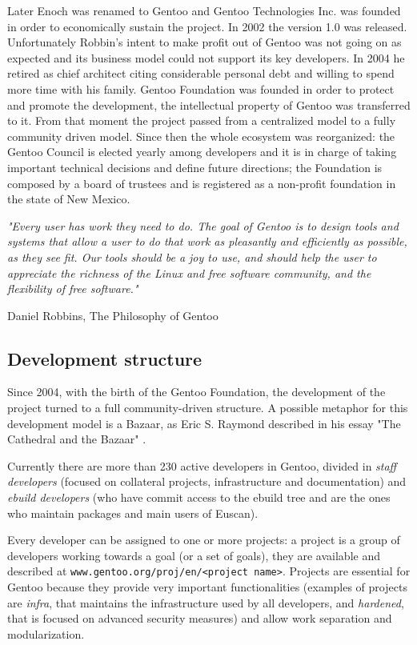 Later Enoch was renamed to Gentoo and Gentoo Technologies Inc. was founded in order to economically sustain the project. In 2002 the version 1.0 was released.
Unfortunately Robbin's intent to make profit out of Gentoo was not going on as expected and its business model could not support its key developers.
In 2004 he retired as chief architect citing considerable personal debt and willing to spend more time with his family. Gentoo Foundation was founded in order to protect and promote the development, the intellectual property of Gentoo was transferred to it. From that moment the project passed from a centralized model to a fully community driven model.
Since then the whole ecosystem was reorganized: the Gentoo Council is elected yearly among developers and it is in charge of taking important technical decisions and define future directions; the Foundation is composed by a board of trustees and is registered as a non-profit foundation in the state of New Mexico.

\vspace{0.8cm}
\emph{"Every user has work they need to do. The goal of Gentoo is to design tools and systems that allow a user to do that work as pleasantly and efficiently as possible, as they see fit. Our tools should be a joy to use, and should help the user to appreciate the richness of the Linux and free software community, and the flexibility of free software."}
\vspace{0.2cm}

\hfill Daniel Robbins, The Philosophy of Gentoo \cite{gentoo_philosophy}


\subsection{Development structure}
Since 2004, with the birth of the Gentoo Foundation, the development of the project turned to a full community-driven structure. A possible metaphor for this development model is a Bazaar, as Eric S. Raymond described in his essay "The Cathedral and the Bazaar" \cite{cathedral_bazaar}.

Currently there are more than 230 active developers in Gentoo, divided in \emph{staff developers} (focused on collateral projects, infrastructure and documentation) and \emph{ebuild developers} (who have commit access to the ebuild tree and are the ones who maintain packages and main users of Euscan).

Every developer can be assigned to one or more projects: a project is a group of developers working towards a goal (or a set of goals), they are available and described at \texttt{www.gentoo.org/proj/en/<project name>}. Projects are essential for Gentoo because they provide very important functionalities (examples of projects are \emph{infra}, that maintains the infrastructure used by all developers, and \emph{hardened}, that is focused on advanced security measures) and allow work separation and modularization.

